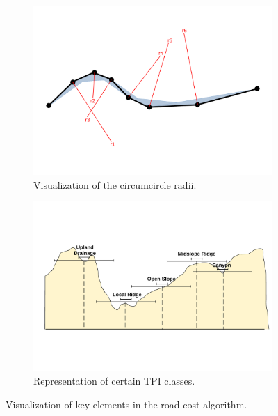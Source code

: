             \begin{figure}[ht]
                \centering
                \begin{subfigure}[b]{0.9\textwidth}
                    \centering
                    \includegraphics[trim={0cm 3.55cm 0cm 2.8cm}, clip, width=\textwidth]{images/path_curvature.pdf}
                    \caption{Visualization of the circumcircle radii.}
                    \label{fig:curvature}
                \end{subfigure}
                \begin{subfigure}[b]{0.9\textwidth}
                    \centering
                    \includegraphics[trim={0cm 5.2cm 0cm 5.2cm}, clip, width=\textwidth]{images/TPI_classification.pdf}
                    \caption{Representation of certain TPI classes.}
                    \label{fig:TPI}
                \end{subfigure}
                \caption{Visualization of key elements in the road cost algorithm.}
            \end{figure}
